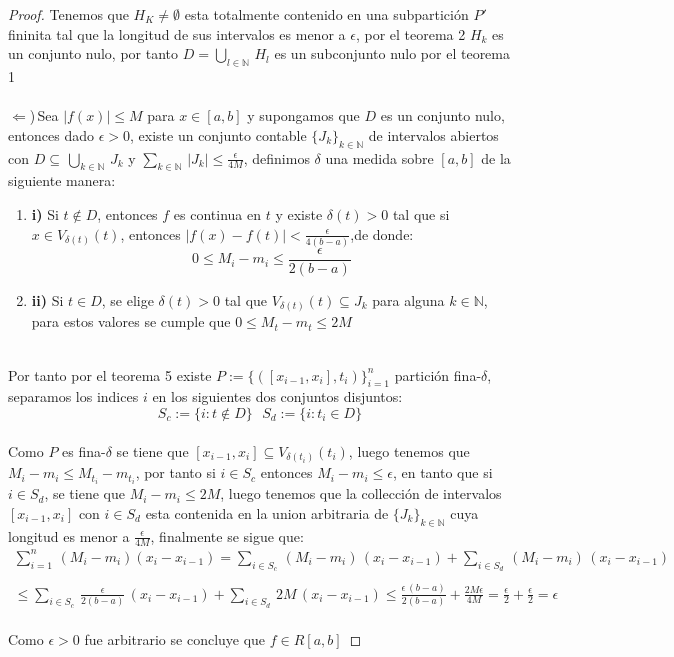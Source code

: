 \documentclass[11pt,letterpaper]{article}
\newcommand{\N}{\mathbb{N}}
\begin{document}
\begin{proof}
    Tenemos que $H_K\neq \emptyset$ esta totalmente contenido en una subpartici\'on $P'$ fininita tal que la longitud de sus intervalos es menor a $\epsilon$, por el teorema 2 $H_k$ es un conjunto nulo, por tanto $D=\bigcup_{l\in \N}\,H_l$
    es un subconjunto nulo por el teorema 1\,\\
    \,\\
    $\Leftarrow$)\,Sea $|f(x)|\leq M$ para $x\in [a,b]$ y supongamos que $D$ es un conjunto nulo, entonces dado $\epsilon>0$, existe un conjunto contable $\{J_k\}_{k\in \N}$ de intervalos abiertos con $D\subseteq\,\bigcup_{k\in \N}\,J_k$ y $\sum_{k\in \N}\,|J_k|\leq \frac{\epsilon}{4M}$, definimos $\delta$ una medida sobre $[a,b]$ de la siguiente manera:\,\\
    \begin{enumerate}
        \item \textbf{i)}\,\,Si $t \notin D$, entonces $f$ es continua en $t$ y existe $\delta(t)>0$ tal que si $x\in V_{\delta(t)}(t)$, entonces $|f(x)-f(t)|<\frac{\epsilon}{4(b-a)}$,de donde:\,\\
        \begin{equation*}
            0\leq M_i-m_i\leq \frac{\epsilon}{2(b-a)}
        \end{equation*}
        \item \textbf{ii)}\,\,Si $t\in D$, se elige $\delta(t)>0$ tal que $V_{\delta(t)}(t)\subseteq J_k$ para alguna $k\in \N$, para estos valores se cumple que $0\leq M_t-m_t\leq 2M$
    \end{enumerate}\,\\
    Por tanto por el teorema 5 existe $P:=\{([x_{i-1},x_i],t_i)\}_{i=1}^{n}$ partici\'on fina-$\delta$, separamos los indices $i$ en los siguientes dos conjuntos disjuntos:\,\\
    \begin{equation*}
        S_c:=\{i:t\notin D\}\,\,\,\,S_d:=\{i:t_i\in D\}
    \end{equation*}\,\\
    Como $P$ es fina-$\delta$ se tiene que $[x_{i-1},x_i]\subseteq V_{\delta(t_i)}(t_i)$, luego tenemos que $M_i-m_i\leq M_{t_i}-m_{t_i}$, por tanto si $i\in S_c$ entonces $M_i-m_i\leq \epsilon$, en tanto que si $i\in S_d$, se tiene que $M_i-m_i\leq 2M$, luego
    tenemos que la collecci\'on de intervalos $[x_{i-1},x_i]$ con $i\in S_d$ esta contenida en la union arbitraria de $\{J_k\}_{k\in \N}$ cuya longitud es menor a $\frac{\epsilon}{4M}$, finalmente se sigue que:\,\\
    \begin{align*}
        \sum_{i=1}^n\,(M_i-m_i)(x_i-x_{i-1})=\sum_{i\in S_c}\,(M_i-m_i)\,(x_i-x_{i-1})+\sum_{i\in S_d}\,(M_i-m_i)\,(x_i-x_{i-1})\,\\
        \,\\
        \leq \sum_{i\in S_c}\,\frac{\epsilon}{2(b-a)}\,(x_i-x_{i-1})+\sum_{i\in S_d}\,2M\,(x_i-x_{i-1})\leq \frac{\epsilon\,(b-a)}{2(b-a)}+\frac{2M\epsilon}{4M}=\frac{\epsilon}{2}+\frac{\epsilon}{2}=\epsilon
    \end{align*}\,\\
    Como $\epsilon>0$ fue arbitrario se concluye que $f\in R[a,b]$
\end{proof}
\end{document}
